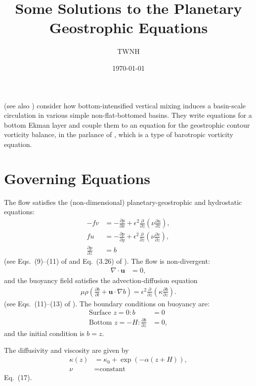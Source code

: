 \documentclass[10pt]{amsart}
\title{Some Solutions to the Planetary Geostrophic Equations}
\author{TWNH}
\date{\today}                                           %
\begin{document}
\maketitle

\citet{peterson&callies26} (see also \citealt{peterson&callies23}) consider how bottom-intensified vertical mixing induces a basin-scale circulation in various simple non-flat-bottomed basins.
They write equations for a bottom Ekman layer and couple them to an equation for the geostrophic contour vorticity balance, in the parlance of \citet{waldman&giordani23}, which is a type of barotropic vorticity equation.

\section{Governing Equations}
The flow satisfies the (non-dimensional) planetary-geostrophic and hydrostatic equations:
\begin{align}
- f v & = - \frac{\partial p}{\partial x} + \epsilon^2 \frac{\partial}{\partial z} \left( \nu \frac{\partial u}{\partial z} \right), \label{eqn:u_mom} \\
f  u & = - \frac{\partial p}{\partial y} + \epsilon^2 \frac{\partial}{\partial z} \left( \nu \frac{\partial v}{\partial z} \right),  \label{eqn:v_mom} \\
\frac{\partial p}{\partial z} & = b
\end{align}
(see Eqs.~(9)--(11) of \citealt{peterson&callies26} and Eq.~(3.26) of \citealt{klinger&haine19}).
The flow is non-divergent:
\begin{align}
\nabla \cdot {\mathbf u} & = 0 ,
\end{align}
and the buoyancy field satisfies the advection-diffusion equation
\begin{align}
\mu \rho \left( \frac{\partial b}{\partial t} + {\mathbf u} \cdot \nabla b \right) = \epsilon^2 \frac{\partial }{\partial z} \left( \kappa \frac{\partial b}{\partial z} \right) .
\label{eqn:b}
\end{align}
(see Eqs.~(11)--(13) of \citealt{peterson&callies26}).
The boundary conditions on buoyancy are:
\begin{align}
\text{Surface~}z = 0:
b &= 0
\label{eqn:sfc_b_bc}
 \\
\text{Bottom~}z = -H:
\frac{\partial b}{\partial z} &= 0 ,
\label{eqn:bot_b_bc}
\end{align}
and the initial condition is $b = z$.

The diffusivity and viscosity are given by
\begin{align}
\kappa(z) & = \kappa_0 + \exp \left( - \alpha (z + H) \right) , \label{eqn:kappa_def} \\
\nu & = \text{constant}
\end{align}
\citet{peterson&callies26} Eq.~(17).
\end{document}
